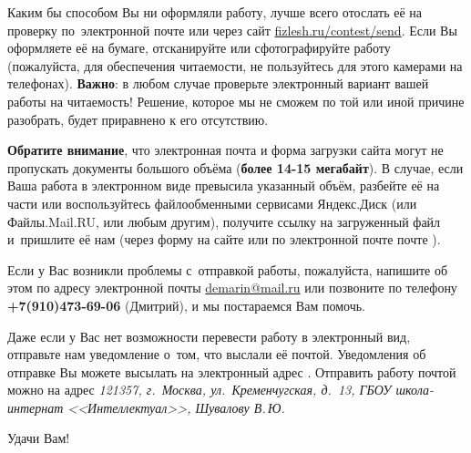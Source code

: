 \documentclass[a4paper,12pt]{article}
\begin{document}
Каким бы способом Вы ни оформляли работу, лучше всего отослать её на проверку по~электронной
почте \href{mailto:\olympmail}{\olympmail}
или через сайт \href{http://fizlesh.ru/contest/send}{fizlesh.ru/contest/send}.
Если Вы оформляете её на бумаге, отсканируйте или сфотографируйте работу
(пожалуйста, для обеспечения читаемости, не пользуйтесь для этого камерами на телефонах).
\textbf{Важно}: в любом случае проверьте электронный вариант вашей работы на читаемость!
Решение, которое мы не сможем по той или иной причине разобрать, будет приравнено к его отсутствию.

\textbf{Обратите внимание}, что электронная почта и форма загрузки сайта могут не пропускать
документы большого объёма (\textbf{более 14-15 мегабайт}). В случае, если Ваша работа в электронном
виде превысила указанный объём, разбейте её на части или воспользуйтесь файлообменными сервисами
\mbox{Яндекс.Диск} (или \mbox{Файлы.Mail.RU}, или любым другим), получите ссылку на загруженный файл
и~пришлите её нам (через форму на сайте или по электронной почте почте \href{mailto:\olympmail}{\olympmail}).

Если у Вас возникли проблемы с~отправкой работы, пожалуйста, напишите об этом по адресу электронной почты
\href{mailto:demarin@mail.ru}{demarin@mail.ru} или позвоните по телефону
\textbf{+7(910)473-69-06} (Дмитрий), и мы постараемся Вам помочь.

Даже если у Вас нет возможности перевести работу в электронный вид, отправьте нам уведомление
о~том, что выслали её почтой. Уведомления об отправке Вы можете высылать
на электронный адрес \href{mailto:\olympmail}{\olympmail}.
Отправить работу почтой можно на адрес \emph{121357, г.~Москва, ул.~Кременчугская, д.~13,
ГБОУ школа-интернат <<Интеллектуал>>, Шувалову В.\,Ю.}

\bigskip
\normalsize

Удачи Вам!
\end{document}
